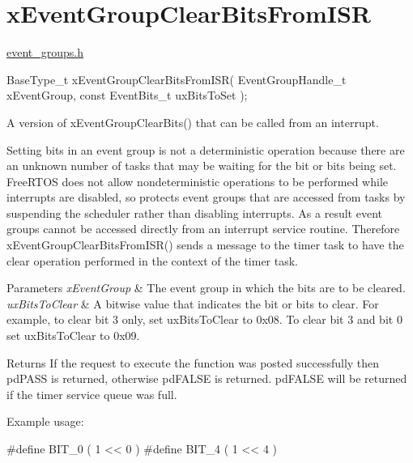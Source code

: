 \hypertarget{group__x_event_group_clear_bits_from_i_s_r}{}\section{x\+Event\+Group\+Clear\+Bits\+From\+I\+SR}
\label{group__x_event_group_clear_bits_from_i_s_r}
\hyperlink{event__groups_8h_source}{event\+\_\+groups.\+h} 
\begin{DoxyPre}
   BaseType\_t xEventGroupClearBitsFromISR( EventGroupHandle\_t xEventGroup, const EventBits\_t uxBitsToSet );
\end{DoxyPre}


A version of x\+Event\+Group\+Clear\+Bits() that can be called from an interrupt.

Setting bits in an event group is not a deterministic operation because there are an unknown number of tasks that may be waiting for the bit or bits being set. Free\+R\+T\+OS does not allow nondeterministic operations to be performed while interrupts are disabled, so protects event groups that are accessed from tasks by suspending the scheduler rather than disabling interrupts. As a result event groups cannot be accessed directly from an interrupt service routine. Therefore x\+Event\+Group\+Clear\+Bits\+From\+I\+S\+R() sends a message to the timer task to have the clear operation performed in the context of the timer task.


\begin{DoxyParams}{Parameters}
{\em x\+Event\+Group} & The event group in which the bits are to be cleared.\\
\hline
{\em ux\+Bits\+To\+Clear} & A bitwise value that indicates the bit or bits to clear. For example, to clear bit 3 only, set ux\+Bits\+To\+Clear to 0x08. To clear bit 3 and bit 0 set ux\+Bits\+To\+Clear to 0x09.\\
\hline
\end{DoxyParams}
\begin{DoxyReturn}{Returns}
If the request to execute the function was posted successfully then pd\+P\+A\+SS is returned, otherwise pd\+F\+A\+L\+SE is returned. pd\+F\+A\+L\+SE will be returned if the timer service queue was full.
\end{DoxyReturn}
Example usage\+: 
\begin{DoxyPre}
  #define BIT\_0 ( 1 << 0 )
  #define BIT\_4 ( 1 << 4 )\end{DoxyPre}



